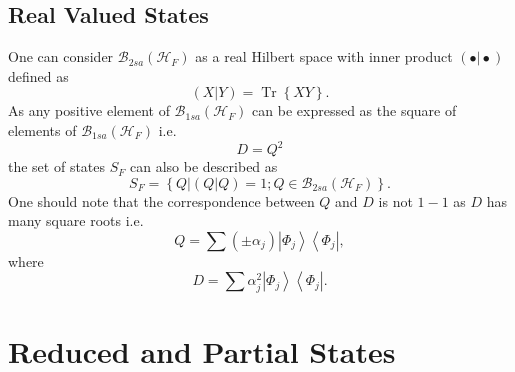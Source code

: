 \documentclass[aps,preprint]{revtex4}%
\begin{document}
\subsection{ Real Valued States}

One can consider $\mathcal{B}_{2sa}\left(  \mathcal{H}_{F}\right)  $ as a real
Hilbert space with inner product $\left(  \left.  \bullet\right\vert
\bullet\right)  $ defined as
\begin{equation}
\left(  \left.  X\right\vert Y\right)  =\operatorname{Tr}\left\{  XY\right\}
.
\end{equation}
As any positive element of $\mathcal{B}_{1sa}\left(  \mathcal{H}_{F}\right)  $
can be expressed as the square of elements of $\mathcal{B}_{1sa}\left(
\mathcal{H}_{F}\right)  $ i.e.%
\begin{equation}
D=Q^{2}%
\end{equation}
the set of states $S_{F}$ can also be described as
\begin{equation}
S_{F}=\left\{  \left.  Q\right\vert \left(  \left.  Q\right\vert Q\right)
=1;Q\in\mathcal{B}_{2sa}\left(  \mathcal{H}_{F}\right)  \right\}  .
\end{equation}
One should note that the correspondence between $Q$ and $D$ is not $1-1$ as
$D$ has many square roots i.e.
\begin{equation}
Q=\sum\left(  \pm\alpha_{j}\right)  \left\vert \Phi_{j}\right\rangle
\left\langle \Phi_{j}\right\vert ,
\end{equation}
where
\begin{equation}
D=\sum\alpha_{j}^{2}\left\vert \Phi_{j}\right\rangle \left\langle \Phi
_{j}\right\vert .
\end{equation}


\section{Reduced and Partial States}
\end{document}
